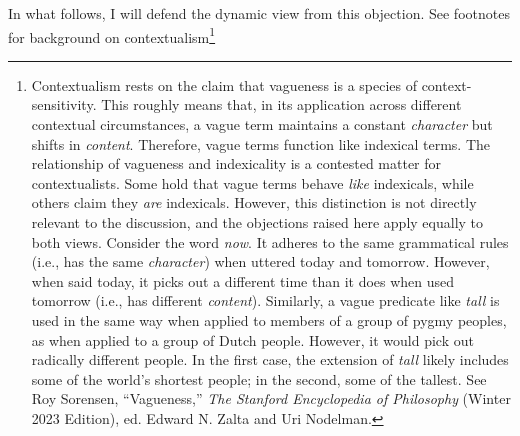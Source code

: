 In what follows, I will defend the dynamic view from this objection. See
footnotes for background on contextualism\footnote{Contextualism rests
  on the claim that vagueness is a species of context-sensitivity. This
  roughly means that, in its application across different contextual
  circumstances, a vague term maintains a constant \textit{character} but
  shifts in \textit{content}. Therefore, vague terms function like
  indexical terms. The relationship of vagueness and indexicality is a
  contested matter for contextualists. Some hold that vague terms behave
  \textit{like} indexicals, while others claim they \textit{are} indexicals.
  However, this distinction is not directly relevant to the discussion,
  and the objections raised here apply equally to both views. Consider
  the word \textit{now}. It adheres to the same grammatical rules (i.e.,
  has the same \textit{character}) when uttered today and tomorrow.
  However, when said today, it picks out a different time than it does
  when used tomorrow (i.e., has different \textit{content}). Similarly, a
  vague predicate like \textit{tall} is used in the same way when applied
  to members of a group of pygmy peoples, as when applied to a group of
  Dutch people. However, it would pick out radically different people.
  In the first case, the extension of \textit{tall} likely includes some
  of the world's shortest people; in the second, some of the tallest.
  See Roy Sorensen, ``Vagueness,'' \textit{The Stanford Encyclopedia of
  Philosophy} (Winter 2023 Edition), ed. Edward N. Zalta and Uri
  Nodelman.}
